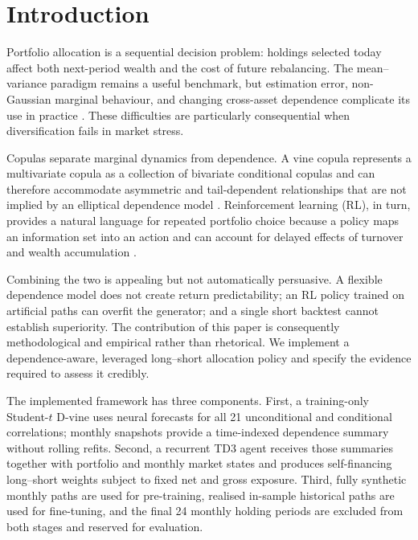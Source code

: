\section{Introduction}
\label{sec:introduction}

Portfolio allocation is a sequential decision problem: holdings selected today affect both next-period wealth and the cost of future rebalancing. The mean--variance paradigm remains a useful benchmark, but estimation error, non-Gaussian marginal behaviour, and changing cross-asset dependence complicate its use in practice \citep{markowitz_portfolio_1952,demiguel_optimal_2009}. These difficulties are particularly consequential when diversification fails in market stress.

Copulas separate marginal dynamics from dependence. A vine copula represents a multivariate copula as a collection of bivariate conditional copulas and can therefore accommodate asymmetric and tail-dependent relationships that are not implied by an elliptical dependence model \citep{bedford_probability_2001,bedford_vinesnew_2002,czado_analyzing_2019}. Reinforcement learning (RL), in turn, provides a natural language for repeated portfolio choice because a policy maps an information set into an action and can account for delayed effects of turnover and wealth accumulation \citep{sutton_reinforcement_2018,lillicrap_continuous_2015}.

Combining the two is appealing but not automatically persuasive. A flexible dependence model does not create return predictability; an RL policy trained on artificial paths can overfit the generator; and a single short backtest cannot establish superiority. The contribution of this paper is consequently methodological and empirical rather than rhetorical. We implement a dependence-aware, leveraged long--short allocation policy and specify the evidence required to assess it credibly.

The implemented framework has three components. First, a training-only Student-$t$ D-vine uses neural forecasts for all 21 unconditional and conditional correlations; monthly snapshots provide a time-indexed dependence summary without rolling refits. Second, a recurrent TD3 agent receives those summaries together with portfolio and monthly market states and produces self-financing long--short weights subject to fixed net and gross exposure. Third, fully synthetic monthly paths are used for pre-training, realised in-sample historical paths are used for fine-tuning, and the final 24 monthly holding periods are excluded from both stages and reserved for evaluation.

